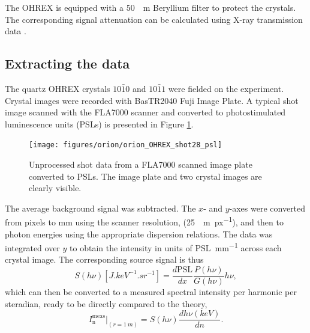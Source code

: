 The OHREX is equipped with a \qty{50}{\mu m} Beryllium filter to protect the crystals. The corresponding signal attenuation can be calculated using X-ray transmission data \cite{henkeXRayInteractionsPhotoabsorption1993}.

\subsection{Extracting the data}
The quartz OHREX crystals $10\bar{1}0$ and $10\bar{1}1$ were fielded on the experiment. Crystal images were recorded with BasTR2040 Fuji Image Plate. A typical shot image scanned with the FLA7000 scanner and converted to photostimulated luminescence units (PSLs) is presented in Figure \ref{fig:orionohrexshot28psl}.
\begin{figure}
	\centering
	\texttt{[image: figures/orion/orion\_OHREX\_shot28\_psl]}
	\caption[Unprocessed IP from ORION experiment]{Unprocessed shot data from a FLA7000 scanned image plate converted to PSLs. The image plate and two crystal images are clearly visible.}
	\label{fig:orionohrexshot28psl}
\end{figure}
The average background signal was subtracted. The $x$- and $y$-axes were converted from pixels to mm using the scanner resolution, (\qty{25}{\mu m.px^{-1}}), and then to photon energies using the appropriate dispersion relations. The data was integrated over $y$ to obtain the intensity in units of \unit{PSL.mm^{-1}} across each crystal image. The corresponding source signal is thus
\begin{equation}
	S(h\nu)[\unit{J.keV^{-1}.sr^{-1}}] = \frac{d\mathrm{PSL}}{dx}\frac{P(h\nu)}{G(h\nu)}h\nu,
\end{equation}
which can then be converted to a measured spectral intensity per harmonic per steradian, ready to be directly compared to the theory,
\begin{equation}
	I^\mathrm{meas}_\mathrm{n}|_{(r = \qty{1}{m})} = S(h\nu)\frac{dh\nu(keV)}{dn}.
\end{equation}

